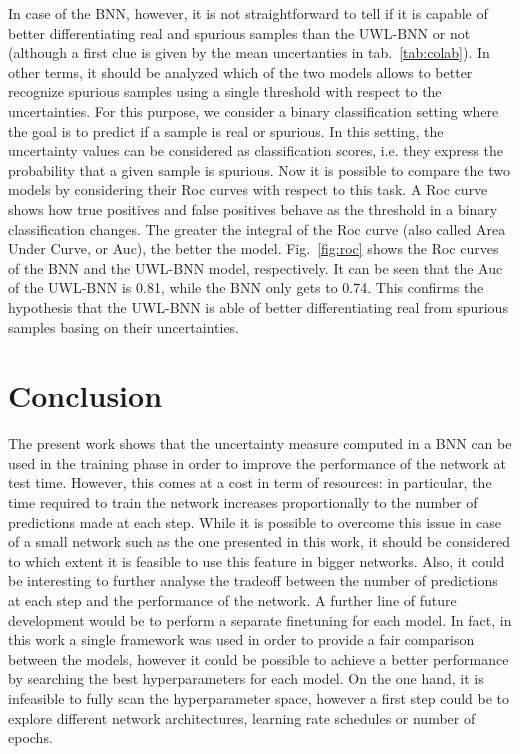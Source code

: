 \documentclass[11pt,twoside,a4paper]{article}
\begin{document}
In case of the BNN, however, it is not straightforward to tell if it is capable of better differentiating real and spurious samples than the UWL-BNN or not (although a first clue is given by the mean uncertanties in tab.~\ref{tab:colab}). In other terms, it should be analyzed which of the two models allows to better recognize spurious samples using a single threshold with respect to the uncertainties.\newline
For this purpose, we consider a binary classification setting where the goal is to predict if a sample is real or spurious. In this setting, the uncertainty values can be considered as classification scores, i.e. they express the probability that a given sample is spurious. Now it is possible to compare the two models by considering their Roc curves with respect to this task. A Roc curve shows how true positives and false positives behave as the threshold in a binary classification changes. The greater the integral of the Roc curve (also called Area Under Curve, or Auc), the better the model.\newline
Fig.~\ref{fig:roc} shows the Roc curves of the BNN and the UWL-BNN model, respectively. It can be seen that the Auc of the UWL-BNN is 0.81, while the BNN only gets to 0.74. This confirms the hypothesis that the UWL-BNN is able of better differentiating real from spurious samples basing on their uncertainties.

\section{Conclusion}
The present work shows that the uncertainty measure computed in a BNN can be used in the training phase in order to improve the performance of the network at test time. However, this comes at a cost in term of resources: in particular, the time required to train the network increases proportionally to the number of predictions made at each step. While it is possible to overcome this issue in case of a small network such as the one presented in this work, it should be considered to which extent it is feasible to use this feature in bigger networks. Also, it could be interesting to further analyse the tradeoff between the number of predictions at each step and the performance of the network.\newline
A further line of future development would be to perform a separate finetuning for each model. In fact, in this work a single framework was used in order to provide a fair comparison between the models, however it could be possible to achieve a better performance by searching the best hyperparameters for each model. On the one hand, it is infeasible to fully scan the hyperparameter space, however a first step could be to explore different network architectures, learning rate schedules or number of epochs.


 
\end{document}
